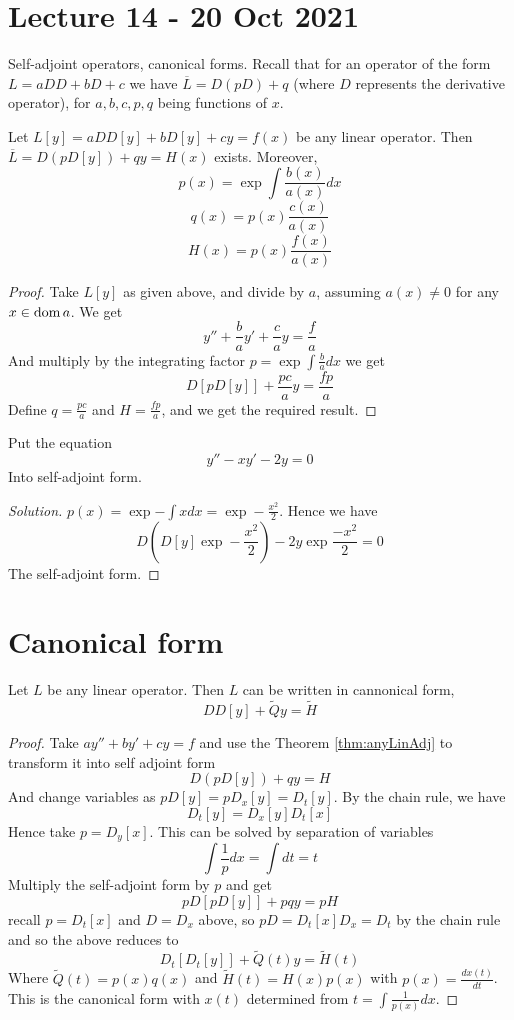 \section{Lecture 14 - 20 Oct 2021}
Self-adjoint operators, canonical forms.
Recall that for an operator of the form $L=aDD+bD+c$ we have $\overline{L}=D(pD) + q$
(where $D$ represents the derivative operator), for $a,b,c,p,q$ being functions of $x$.
\begin{theorem}
  Let $L[y]=aDD[y]+bD[y]+cy=f(x)$ be any linear operator. Then $\overline{L}=D(pD[y]) + qy=H(x)$ exists. Moreover, 
  \[p(x)=\exp{\int\frac{b(x)}{a(x)}dx}\]
  \[q(x)=p(x)\frac{c(x)}{a(x)}\]
  \[H(x)=p(x)\frac{f(x)}{a(x)}\]
  \label{thm:anyLinAdj}
\end{theorem}
\begin{proof}
  Take $L[y]$ as given above, and divide by $a$, assuming $a(x)\neq 0$ for any $x\in\operatorname{dom}
  a$. We get
  \[y''+\frac{b}{a}y'+\frac{c}{a}y = \frac{f}{a}\]
  And multiply by the integrating factor $p=\exp{\int\frac{b}{a}dx}$ we get
  \[D[pD[y]]+\frac{pc}{a}y = \frac{fp}{a}\]
  Define $q=\frac{pc}{a}$ and $H=\frac{fp}{a}$, and we get the required result.
\end{proof}


\begin{example}
  Put the equation 
  \[y''-xy'-2y=0\]
  Into self-adjoint form.
\end{example}
\begin{proof}[Solution]
  $p(x)=\exp{-\int x dx}=\exp -\frac{x^2}{2}$. Hence we have 
  \[D(D[y]\exp -\frac{x^2}{2}) - 2y\exp \frac{-x^2}{2}=0\]
  The self-adjoint form.
\end{proof}

\section{Canonical form}

\begin{theorem}
  Let $L$ be any linear operator. Then $L$ can be written in cannonical form,
  \[DD[y] + \tilde{Q}y = \tilde{H}\]
  \label{thm:anyLinCan}
\end{theorem}
\begin{proof}
  Take $ay''+by'+cy=f$ and use the Theorem \ref{thm:anyLinAdj} to transform it into self
  adjoint form
  \[D(pD[y]) +qy=H\]
  And change variables as $pD[y]=pD_x[y]=D_t[y]$. By the chain rule, we have 
  \[D_t[y]= D_x[y]D_t[x]\]
  Hence take $p=D_y[x]$. This can be solved by separation of variables
  \[\int \frac{1}{p}dx = \int dt=t\]
  Multiply the self-adjoint form by $p$ and get 
  \[pD[pD[y]]+pqy = pH\]
  recall $p=D_t[x]$ and $D=D_x$ above, so $pD=D_t[x]D_x=D_t$ by the chain rule and so  the
  above reduces to 
  \[D_t[D_t[y]]+\tilde{Q}(t)y=\tilde{H}(t)\]
  Where $\tilde{Q}(t)=p(x)q(x)$ and $\tilde{H}(t)=H(x)p(x)$ with
  $p(x)=\frac{dx(t)}{dt}$. This is the canonical form with $x(t)$ determined from $t=\int
  \frac{1}{p(x)}dx$.
\end{proof}


